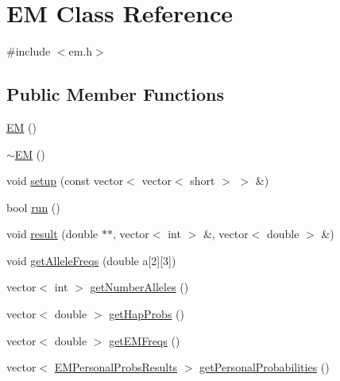 \hypertarget{classEM}{
\section{EM Class Reference}
\label{classEM}
}


{\ttfamily \#include $<$em.h$>$}

\subsection*{Public Member Functions}
\begin{DoxyCompactItemize}
\item 
\hyperlink{classEM_ab63fb999a41e57947ecd2e61c073c5ef}{EM} ()
\item 
\hyperlink{classEM_a5da3eaa0aa91b3925de2c5bca158faca}{$\sim$EM} ()
\item 
void \hyperlink{classEM_abcc9e390b2a2c8143bfa364a7911d6fa}{setup} (const vector$<$ vector$<$ short $>$ $>$ \&)
\item 
bool \hyperlink{classEM_a18638c8e6a8da46ca0ea77981c275486}{run} ()
\item 
void \hyperlink{classEM_abe803c5ae01733a57224c3d530ae2921}{result} (double $\ast$$\ast$, vector$<$ int $>$ \&, vector$<$ double $>$ \&)
\item 
void \hyperlink{classEM_ac3787d2909eb87ac231b533482d1f644}{getAlleleFreqs} (double a\mbox{[}2\mbox{]}\mbox{[}3\mbox{]})
\item 
vector$<$ int $>$ \hyperlink{classEM_a5050cd53ebe803ee4e677119af7869ae}{getNumberAlleles} ()
\item 
vector$<$ double $>$ \hyperlink{classEM_ac7552d323bf702bc7a76ade909415cab}{getHapProbs} ()
\item 
vector$<$ double $>$ \hyperlink{classEM_ab5f91b9b53ea2090197c8e389ffa5a38}{getEMFreqs} ()
\item 
vector$<$ \hyperlink{structEMPersonalProbsResults}{EMPersonalProbsResults} $>$ \hyperlink{classEM_a07bb2d56390f494c885bd7c7ea4b53b9}{getPersonalProbabilities} ()
\end{DoxyCompactItemize}
